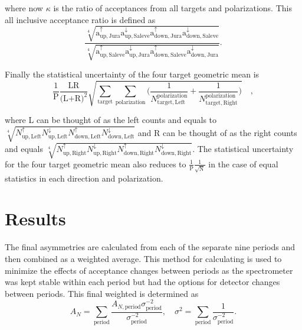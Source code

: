 \noindent
where now $\kappa$ is the ratio of acceptances from all targets and
polarizations.  This all inclusive acceptance ratio is defined as
\begin{equation}
  \label{equ::acc4TargGeoMean}
  \frac{
    \sqrt[4]{
      \mathrm{a}^{\uparrow}_{\mathrm{up,Jura}}
      \mathrm{a}^{\downarrow}_{\mathrm{up,Saleve}}
      \mathrm{a}^{\uparrow}_{\mathrm{down,Jura}}
      \mathrm{a}^{\downarrow}_{\mathrm{down,Saleve}}}
  }{
    \sqrt[4]{
      \mathrm{a}^{\uparrow}_{\mathrm{up,Saleve}}
      \mathrm{a}^{\downarrow}_{\mathrm{up,Jura}}
      \mathrm{a}^{\uparrow}_{\mathrm{down,Saleve}}
      \mathrm{a}^{\downarrow}_{\mathrm{down,Jura}}}
  }.
\end{equation}

Finally the statistical uncertainty of the four target geometric mean is
\begin{equation}
  \frac{1}{\mathrm{P}}
  \frac{\text{LR}}{\Big( \text{L+R} \Big)^2}
  \sqrt{
    \sum_{\mathrm{target}}\sum_{\mathrm{polarization}}
    \Big(
    \frac{1}{N_{\mathrm{target,Left}}^{\mathrm{polarization}}}
    +
    \frac{1}{N_{\mathrm{target,Right}}^{\mathrm{polarization}}}
    \Big)
  } \quad,
\end{equation}

\noindent
where L can be thought of as the left counts and equals to
$\sqrt[4]{N_{\mathrm{up,Left}}^{\uparrow}N_{\mathrm{up,
      Left}}^{\downarrow}N_{\mathrm{down,Left}}^{\uparrow}N_{\mathrm{down,
      Left}}^{\downarrow}}$ and R can be thought of as the right counts and
equals $\sqrt[4]{N_{\mathrm{up,Right}}^{\uparrow}N_{\mathrm{up,
      Right}}^{\downarrow}N_{\mathrm{down,Right}}^{\uparrow}N_{\mathrm{down,
      Right}}^{\downarrow}}$.  The statistical uncertainty for the four target
geometric mean also reduces to $\frac{1}{\mathrm{P}}\frac{1}{\sqrt{\mathrm{N}}}$
in the case of equal statistics in each direction and polarization.


\section{Results}
The final asymmetries are calculated from each of the separate nine periods and
then combined as a weighted average.  This method for calculating is used to
minimize the effects of acceptance changes between periods as the spectrometer
was kept stable within each period but had the options for detector changes
between periods.  This final weighted is determined as
\begin{equation}
  A_N =
  \sum_{\mathrm{period}}
  \frac{A_{N,\mathrm{period}}\sigma^{-2}_{\mathrm{period}}}{\sigma^{-2}_{\mathrm{period}}},
  \quad \sigma^2 = \sum_{\mathrm{period}} \frac{1}{\sigma^{-2}_{\mathrm{period}}}.
\end{equation}

